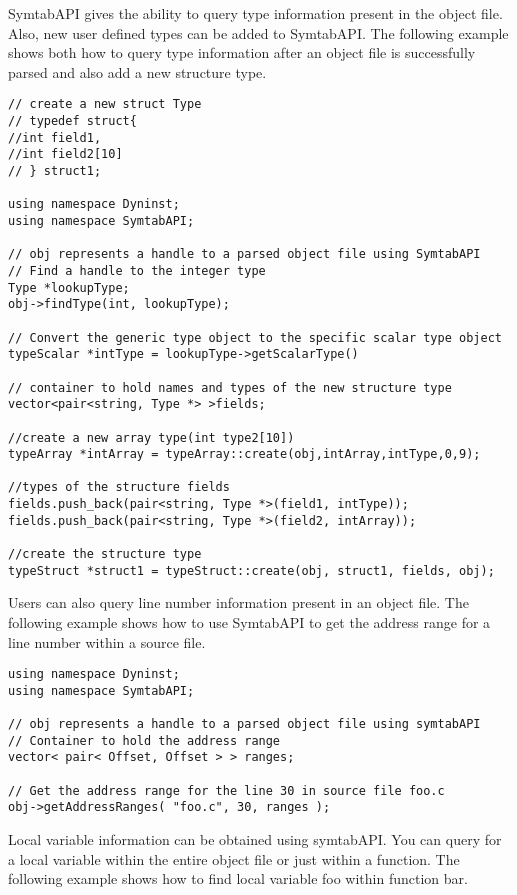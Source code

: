 SymtabAPI gives the ability to query type information present in the object file. Also, new user defined types can be added to SymtabAPI. The following example shows both how to query type information after an object file is successfully parsed and also add a new structure type.

\begin{lstlisting}
// create a new struct Type
// typedef struct{
//int field1,
//int field2[10]
// } struct1;

using namespace Dyninst;
using namespace SymtabAPI;

// obj represents a handle to a parsed object file using SymtabAPI
// Find a handle to the integer type
Type *lookupType;
obj->findType(int, lookupType);

// Convert the generic type object to the specific scalar type object
typeScalar *intType = lookupType->getScalarType()

// container to hold names and types of the new structure type
vector<pair<string, Type *> >fields;

//create a new array type(int type2[10])
typeArray *intArray = typeArray::create(obj,intArray,intType,0,9);

//types of the structure fields
fields.push_back(pair<string, Type *>(field1, intType));
fields.push_back(pair<string, Type *>(field2, intArray));

//create the structure type
typeStruct *struct1 = typeStruct::create(obj, struct1, fields, obj);
\end{lstlisting}

Users can also query line number information present in an object file. The following example shows how to use SymtabAPI to get the address range for a line number within a source file.

\begin{lstlisting}
using namespace Dyninst;
using namespace SymtabAPI;

// obj represents a handle to a parsed object file using symtabAPI
// Container to hold the address range
vector< pair< Offset, Offset > > ranges;

// Get the address range for the line 30 in source file foo.c
obj->getAddressRanges( "foo.c", 30, ranges );
\end{lstlisting}

Local variable information can be obtained using symtabAPI. You can query for a local variable within the entire object file or just within a function. The following example shows how to find local variable foo within function bar.

